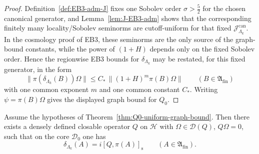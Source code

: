 \begin{proof}
Definition~\ref{def:EB3-adm-J} fixes one Sobolev order
\(\sigma>\frac52\) for the chosen canonical generator, and
Lemma~\ref{lem:J-EB3-adm} shows that the corresponding finitely many locality/Sobolev
seminorms are cutoff-uniform for that fixed
\(\mathcal J^{\mathrm{can}}_{\Lambda_k}\). In the cosmology proof of EB3, these
seminorms are the only source of the graph-bound constants, while the power of
\((1+H)\) depends only on the fixed Sobolev order. Hence the regionwise EB3 bounds
for \(\delta_{\Lambda_k}\) may be restated, for this fixed generator, in the form
\[
\|\pi(\delta_{\Lambda_k}(B))\Omega\|
\le
C_*\,\|(1+H)^m\pi(B)\Omega\|
\qquad(B\in\mathfrak A_{\mathrm{fin}})
\]
with one common exponent \(m\) and one common constant \(C_*\). Writing
\(\psi=\pi(B)\Omega\) gives the displayed graph bound for \(Q_0\).
\end{proof}

\begin{proposition}
\label{prop:delta-implementable}
Assume the hypotheses of Theorem~\ref{thm:Q0-uniform-graph-bound}. Then there
exists a densely defined closable operator \(Q\) on \(\mathcal H\) with
\(\Omega\in\mathcal D(Q)\), \(Q\Omega=0\), such that on the core \(\mathcal D_0\) one has
\[
\delta_{\Lambda_k}(A)=i[Q,\pi(A)]_{\mathrm s}\qquad(A\in\mathfrak A_{\mathrm{fin}}).
\]
\end{proposition}

